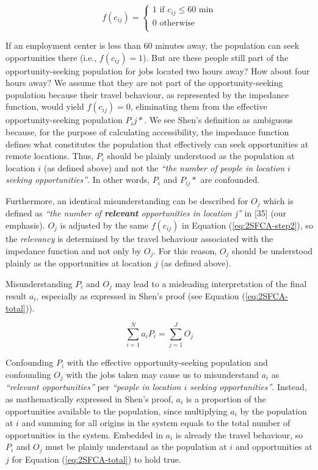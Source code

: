 \documentclass[10pt,letterpaper]{article}
\begin{document}
\begin{equation}
\label{eq:binary-impedance}
f(c_{ij}) =
\begin{cases}
1\text{ if }c_{ij}\leq60\text{ min}\\
0\text{ otherwise}\\
\end{cases}
\end{equation}

If an employment center is less than 60 minutes away, the population can
seek opportunities there (i.e., \(f(c_{ij})=1\)). But are these people
still part of the opportunity-seeking population for jobs located two
hours away? How about four hours away? We assume that they are not part
of the opportunity-seeking population because their travel behaviour, as
represented by the impedance function, would yield \(f(c_{ij})=0\),
eliminating them from the effective opportunity-seeking population
\(P_ij*\). We see Shen's definition as ambiguous because, for the
purpose of calculating accessibility, the impedance function defines
what constitutes the population that effectively can seek opportunities
at remote locations. Thus, \(P_i\) should be plainly understood as the
population at location \(i\) (as defined above) and not the \emph{``the
number of people in location \(i\) seeking opportunities''}. In other
words, \(P_i\) and \(P_{ij}*\) are confounded.

Furthermore, an identical misunderstanding can be described for \(O_j\)
which is defined as \emph{``the number of \textbf{relevant}
opportunities in location j''} in {[}35{]} (our emphasis). \(O_j\) is
adjusted by the same \(f(c_{ij})\) in Equation (\ref{eq:2SFCA-step2}),
so the \emph{relevancy} is determined by the travel behaviour associated
with the impedance function and not only by \(O_j\). For this reason,
\(O_j\) should be understood plainly as the opportunities at location
\(j\) (as defined above).

Misunderstanding \(P_i\) and \(O_j\) may lead to a misleading
interpretation of the final result \(a_i\), especially as expressed in
Shen's proof (see Equation (\ref{eq:2SFCA-total})).

\begin{equation}
\label{eq:2SFCA-total}
\sum_{i=1}^N a_{i} P_i= \sum_{j=1}^JO_j
\end{equation}

Confounding \(P_i\) with the effective opportunity-seeking population
and confounding \(O_j\) with the jobs taken may cause us to
misunderstand \(a_{i}\) as \emph{``relevant opportunities''} per
\emph{``people in location \(i\) seeking opportunities''}. Instead, as
mathematically expressed in Shen's proof, \(a_{i}\) is a proportion of
the opportunities available to the population, since multiplying \(a_i\)
by the population at \(i\) and summing for all origins in the system
equals to the total number of opportunities in the system. Embedded in
\(a_i\) is already the travel behaviour, so \(P_i\) and \(O_j\) must be
plainly understand as the population at \(i\) and opportunities at \(j\)
for Equation (\ref{eq:2SFCA-total}) to hold true.
\end{document}
